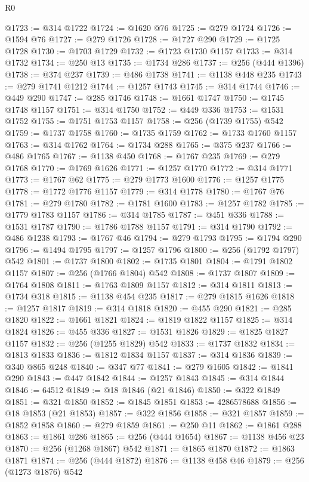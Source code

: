 \begin{lexlean}{R0}
\begin{coremodule}
@1723 := @314 @1722
@1724 := @1620 @76
@1725 := @279 @1724
@1726 := @1594 @76
@1727 := @279 @1726
@1728 := @1727 @290
@1729 := @1725 @1728
@1730 := @1703 @1729
@1732 := @1723 @1730 @1157
@1733 := @314 @1732
@1734 := @250 @13
@1735 := @1734 @286
@1737 := @256 (@444 @1396)
@1738 := @374 @237
@1739 := @486 @1738
@1741 := @1138 @448 @235
@1743 := @279 @1741 @1212
@1744 := @1257 @1743
@1745 := @314 @1744
@1746 := @449 @290
@1747 := @285 @1746
@1748 := @1661 @1747
@1750 := @1745 @1748 @1157
@1751 := @314 @1750
@1752 := @449 @336
@1753 := @1531 @1752
@1755 := @1751 @1753 @1157
@1758 := @256 (@1739 @1755) @542
@1759 := @1737 @1758
@1760 := @1735 @1759
@1762 := @1733 @1760 @1157
@1763 := @314 @1762
@1764 := @1734 @288
@1765 := @375 @237
@1766 := @486 @1765
@1767 := @1138 @450
@1768 := @1767 @235
@1769 := @279 @1768
@1770 := @1769 @1626
@1771 := @1257 @1770
@1772 := @314 @1771
@1773 := @1767 @62
@1775 := @279 @1773 @1600
@1776 := @1257 @1775
@1778 := @1772 @1776 @1157
@1779 := @314 @1778
@1780 := @1767 @76
@1781 := @279 @1780
@1782 := @1781 @1600
@1783 := @1257 @1782
@1785 := @1779 @1783 @1157
@1786 := @314 @1785
@1787 := @451 @336
@1788 := @1531 @1787
@1790 := @1786 @1788 @1157
@1791 := @314 @1790
@1792 := @486 @1238
@1793 := @1767 @46
@1794 := @279 @1793
@1795 := @1794 @290
@1796 := @1494 @1795
@1797 := @1257 @1796
@1800 := @256 (@1792 @1797) @542
@1801 := @1737 @1800
@1802 := @1735 @1801
@1804 := @1791 @1802 @1157
@1807 := @256 (@1766 @1804) @542
@1808 := @1737 @1807
@1809 := @1764 @1808
@1811 := @1763 @1809 @1157
@1812 := @314 @1811
@1813 := @1734 @318
@1815 := @1138 @454 @235
@1817 := @279 @1815 @1626
@1818 := @1257 @1817
@1819 := @314 @1818
@1820 := @455 @290
@1821 := @285 @1820
@1822 := @1661 @1821
@1824 := @1819 @1822 @1157
@1825 := @314 @1824
@1826 := @455 @336
@1827 := @1531 @1826
@1829 := @1825 @1827 @1157
@1832 := @256 (@1255 @1829) @542
@1833 := @1737 @1832
@1834 := @1813 @1833
@1836 := @1812 @1834 @1157
@1837 := @314 @1836
@1839 := @340 @865 @248
@1840 := @347 @77
@1841 := @279 @1605
@1842 := @1841 @290
@1843 := @447 @1842
@1844 := @1257 @1843
@1845 := @314 @1844
@1846 := 64512
@1849 := @18 @1846 (@21 @1846)
@1850 := @322 @1849
@1851 := @321 @1850
@1852 := @1845 @1851
@1853 := 4286578688
@1856 := @18 @1853 (@21 @1853)
@1857 := @322 @1856
@1858 := @321 @1857
@1859 := @1852 @1858
@1860 := @279 @1859
@1861 := @250 @11
@1862 := @1861 @288
@1863 := @1861 @286
@1865 := @256 (@444 @1654)
@1867 := @1138 @456 @23
@1870 := @256 (@1268 @1867) @542
@1871 := @1865 @1870
@1872 := @1863 @1871
@1874 := @256 (@444 @1872)
@1876 := @1138 @458 @46
@1879 := @256 (@1273 @1876) @542

\end{coremodule}
\end{lexlean}

